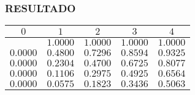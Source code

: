 \documentclass[10]{beamer}
\begin{document}
\begin{frame}
\color{white}
\frametitle{RESULTADO}
\begin{table}
 \begin{tabular}{ c | c  | c  | c  | c }
 \\  $0$ & $1$   & $2$   & $3$   & $4$  \\ 
 \hline \hline 
   & $1.0000$   & $1.0000$   & $1.0000$   & $1.0000$   \\ 
 $0.0000$ & $0.4800$   & $0.7296$   & $0.8594$   & $0.9325$   \\ 
 $0.0000$ & $0.2304$   & $0.4700$   & $0.6725$   & $0.8077$   \\ 
 $0.0000$ & $0.1106$   & $0.2975$   & $0.4925$   & $0.6564$   \\ 
 $0.0000$ & $0.0575$   & $0.1823$   & $0.3436$   & $0.5063$   \\ 
 \end{tabular}
 \end{table}
 \end{frame} 
\end{document}
